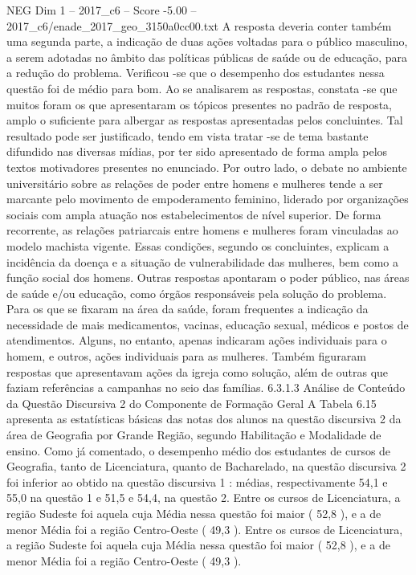 \begin{textsample}{NEG Dim 1 – 2017\_c6 – Score -5.00 – 2017\_c6/enade\_2017\_geo\_3150a0cc00.txt}
A resposta deveria conter também uma segunda parte, a indicação de duas ações voltadas para o público masculino, a serem adotadas no âmbito das políticas públicas de saúde ou de educação, para a redução do problema.
Verificou -se que o desempenho dos estudantes nessa questão foi de médio para bom.
Ao se analisarem as respostas, constata -se que muitos foram os que apresentaram os tópicos presentes no padrão de resposta, amplo o suficiente para albergar as respostas apresentadas pelos concluintes.
Tal resultado pode ser justificado, tendo em vista tratar -se de tema bastante difundido nas diversas mídias, por ter sido apresentado de forma ampla pelos textos motivadores presentes no enunciado.
Por outro lado, o debate no ambiente universitário sobre as relações de poder entre homens e mulheres tende a ser marcante pelo movimento de empoderamento feminino, liderado por organizações sociais com ampla atuação nos estabelecimentos de nível superior.
De forma recorrente, as relações patriarcais entre homens e mulheres foram vinculadas ao modelo machista vigente.
Essas condições, segundo os concluintes, explicam a incidência da doença e a situação de vulnerabilidade das mulheres, bem como a função social dos homens.
Outras respostas apontaram o poder público, nas áreas de saúde e/ou educação, como órgãos responsáveis pela solução do problema.
Para os que se fixaram na área da saúde, foram frequentes a indicação da necessidade de mais medicamentos, vacinas, educação sexual, médicos e postos de atendimentos.
Alguns, no entanto, apenas indicaram ações individuais para o homem, e outros, ações individuais para as mulheres.
Também figuraram respostas que apresentavam ações da igreja como solução, além de outras que faziam referências a campanhas no seio das famílias. 6.3.1.3 Análise de Conteúdo da Questão Discursiva 2 do Componente de Formação Geral A Tabela 6.15 apresenta as estatísticas básicas das notas dos alunos na questão discursiva 2 da área de Geografia por Grande Região, segundo Habilitação e Modalidade de ensino.
Como já comentado, o desempenho médio dos estudantes de cursos de Geografia, tanto de Licenciatura, quanto de Bacharelado, na questão discursiva 2 foi inferior ao obtido na questão discursiva 1 : médias, respectivamente 54,1 e 55,0 na questão 1 e 51,5 e 54,4, na questão 2.
Entre os cursos de Licenciatura, a região Sudeste foi aquela cuja Média nessa questão foi maior ( 52,8 ), e a de menor Média foi a região Centro-Oeste ( 49,3 ).
Entre os cursos de Licenciatura, a região Sudeste foi aquela cuja Média nessa questão foi maior ( 52,8 ), e a de menor Média foi a região Centro-Oeste ( 49,3 ).

\end{textsample}
